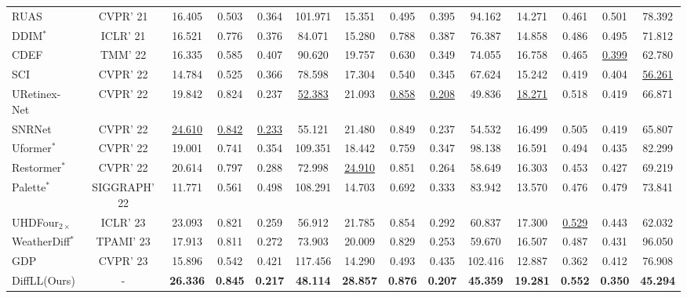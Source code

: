 \begin{table*}[!t]
{\begin{tabular}{l|c|cccc|cccc|cccc}
			RUAS & CVPR' 21 & 16.405 & 0.503 & 0.364 & 101.971 & 15.351 & 0.495 & 0.395 & 94.162 & 14.271 & 0.461 & 0.501 & 78.392 \\
			DDIM$^{\ast}$ & ICLR' 21 & 16.521 & 0.776 & 0.376 & 84.071 & 15.280 & 0.788 & 0.387 & 76.387 & 14.858 & 0.486 & 0.495 & 71.812 \\
			CDEF & TMM' 22 & 16.335 & 0.585 & 0.407 & 90.620 & 19.757 & 0.630 & 0.349 & 74.055 & 16.758 & 0.465 & \underline{0.399} & 62.780 \\
			SCI & CVPR' 22 & 14.784 & 0.525 & 0.366 & 78.598 & 17.304 & 0.540 & 0.345 & 67.624 & 15.242 & 0.419 & 0.404 & \underline{56.261} \\
			URetinex-Net & CVPR' 22 & 19.842 & 0.824 & 0.237 & \underline{52.383} & 21.093 & \underline{0.858} & \underline{0.208} & 49.836 & \underline{18.271} & 0.518 & 0.419 & 66.871 \\
			SNRNet & CVPR' 22 & \underline{24.610} & \underline{0.842} & \underline{0.233} & 55.121 & 21.480 & 0.849 & 0.237 & 54.532 & 16.499 & 0.505 & 0.419 & 65.807 \\
			Uformer$^{\ast}$ & CVPR' 22 & 19.001 & 0.741 & 0.354 & 109.351 & 18.442 & 0.759 & 0.347 & 98.138 & 16.591 & 0.494 & 0.435 & 82.299 \\
			Restormer$^{\ast}$ & CVPR' 22 & 20.614 & 0.797 & 0.288 & 72.998 & \underline{24.910} & 0.851 & 0.264 & 58.649 & 16.303 & 0.453 & 0.427 & 69.219 \\
			Palette$^{\ast}$ & SIGGRAPH' 22 & 11.771 & 0.561 & 0.498 & 108.291 & 14.703 & 0.692 & 0.333 & 83.942 & 13.570 & 0.476 & 0.479 & 73.841 \\
			UHDFour$_{2\times}$ & ICLR' 23 & 23.093 & 0.821 & 0.259 & 56.912 & 21.785 & 0.854 & 0.292 & 60.837 & 17.300 & \underline{0.529} & 0.443 & 62.032 \\
			WeatherDiff$^{\ast}$ & TPAMI' 23 & 17.913 & 0.811 & 0.272 & 73.903 & 20.009 & 0.829 & 0.253 & 59.670 & 16.507 & 0.487 & 0.431 & 96.050 \\
			GDP & CVPR' 23 & 15.896 & 0.542 & 0.421 & 117.456 & 14.290 & 0.493 & 0.435 & 102.416 & 12.887 & 0.362 & 0.412 & 76.908 \\
			DiffLL(Ours) & - & \textbf{26.336} & \textbf{0.845} & \textbf{0.217} & \textbf{48.114} & \textbf{28.857} & \textbf{0.876} & \textbf{0.207} & \textbf{45.359} & \textbf{19.281} & \textbf{0.552} & \textbf{0.350} & \textbf{45.294} \\
			\bottomrule
	\end{tabular}}
	\label{tab:evaluation_paired}
\end{table*}

